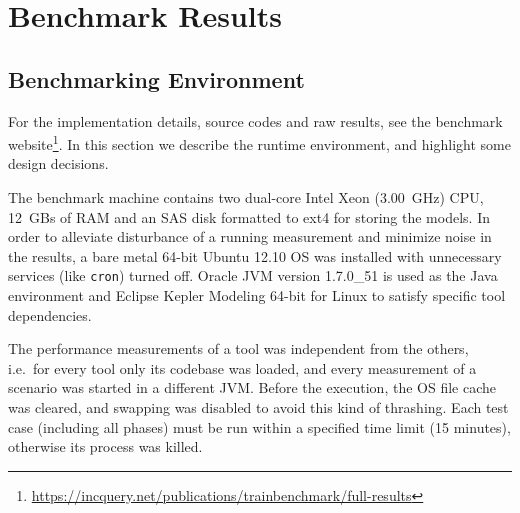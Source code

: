 \chapter{Benchmark Results}
\label{cha:benchmarkresults}

\section{Benchmarking Environment}
\label{sec:environment}

For the implementation details, source codes and raw results, see the benchmark website\footnote{\url{https://incquery.net/publications/trainbenchmark/full-results}}. In this section we describe the runtime environment, and highlight some design decisions.

The benchmark machine contains two dual-core Intel Xeon (3.00~GHz) CPU, 12~GBs of RAM and an SAS disk formatted to ext4 for storing the models. In order to alleviate disturbance of a running measurement and minimize noise in the results, a bare metal 64-bit Ubuntu 12.10 OS was installed with unnecessary services (like \texttt{cron}) turned off. Oracle JVM version 1.7.0\_51 is used as the Java environment and Eclipse Kepler Modeling 64-bit for Linux to satisfy specific tool dependencies.

The performance measurements of a tool was independent from the others, i.e.\ for every tool only its codebase was loaded, and every measurement of a scenario was started in a different JVM. Before the execution, the OS file cache was cleared, and swapping was disabled to avoid this kind of thrashing. Each test case (including all phases) must be run within a specified time limit (15 minutes), otherwise its process was killed.


